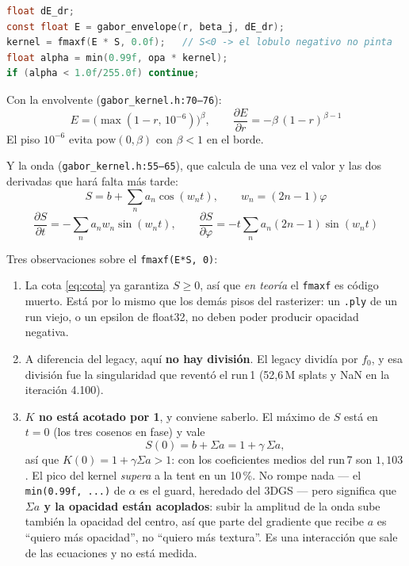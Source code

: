 \documentclass[12pt]{extarticle}
\newcommand{\ssum}{\Sigma a}
\newcommand{\code}[1]{\texttt{#1}}
\begin{document}
\begin{lstlisting}[language=C]
float dE_dr;
const float E = gabor_envelope(r, beta_j, dE_dr);
kernel = fmaxf(E * S, 0.0f);   // S<0 -> el lobulo negativo no pinta
float alpha = min(0.99f, opa * kernel);
if (alpha < 1.0f/255.0f) continue;
\end{lstlisting}

Con la envolvente (\code{gabor\_kernel.h:70--76}):
\[
E=\bigl(\max(1-r,\,10^{-6})\bigr)^{\beta},\qquad
\frac{\partial E}{\partial r}=-\beta\,(1-r)^{\beta-1}
\]
El piso $10^{-6}$ evita $\mathrm{pow}(0,\beta)$ con $\beta<1$ en el borde.

Y la onda (\code{gabor\_kernel.h:55--65}), que calcula de una vez el valor y
las dos derivadas que hará falta más tarde:
\[
S=b+\sum_n a_n\cos(w_n t),\qquad w_n=(2n-1)\varphi
\]
\[
\frac{\partial S}{\partial t}=-\sum_n a_n w_n\sin(w_n t),\qquad
\frac{\partial S}{\partial \varphi}=-t\sum_n a_n(2n-1)\sin(w_n t)
\]

Tres observaciones sobre el \code{fmaxf(E*S, 0)}:

\begin{enumerate}
\item La cota \eqref{eq:cota} ya garantiza $S\ge0$, así que \emph{en teoría} el
      \code{fmaxf} es código muerto. Está por lo mismo que los demás pisos del
      rasterizer: un \code{.ply} de un run viejo, o un epsilon de float32,
      no deben poder producir opacidad negativa.
\item A diferencia del legacy, aquí \textbf{no hay división}. El legacy dividía
      por $f_0$, y esa división fue la singularidad que reventó el run\,1
      (52,6\,M splats y NaN en la iteración 4.100).
\item \textbf{$K$ no está acotado por 1}, y conviene saberlo. El máximo de $S$
      está en $t=0$ (los tres cosenos en fase) y vale
      \[
      S(0)=b+\ssum=1+\gamma\,\ssum ,
      \]
      así que $K(0)=1+\gamma\ssum>1$: con los coeficientes medios del run\,7
      son $1{,}103$. El pico del kernel \emph{supera} a la tent en un
      10\,\%. No rompe nada --- el \code{min(0.99f, ...)} de $\alpha$ es el
      guard, heredado del 3DGS --- pero significa que
      \textbf{$\ssum$ y la opacidad están acoplados}: subir la amplitud de la
      onda sube también la opacidad del centro, así que parte del gradiente
      que recibe $a$ es ``quiero más opacidad'', no ``quiero más textura''.
      Es una interacción que sale de las ecuaciones y no está medida.
\end{enumerate}
\end{document}
